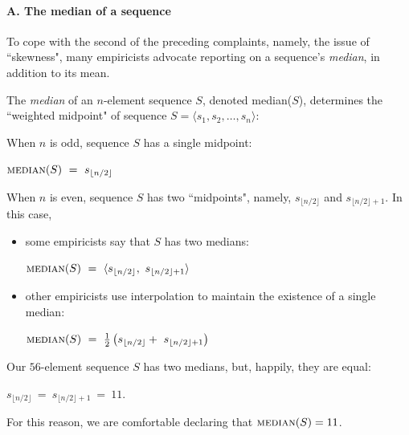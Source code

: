 \paragraph{A. The median of a sequence} 
To cope with the second of the preceding complaints, namely, the issue of ``skewness", many empiricists advocate reporting on a sequence's {\it median}, in addition to its mean.

\noindent
The {\em median} of an $n$-element sequence $S$, denoted {\sc median}($S$), determines 
the ``weighted midpoint" of  sequence $S = \langle s_1, s_2, \ldots, s_n \rangle$:

\medskip

\noindent When $n$ is odd, sequence $S$ has a single midpoint:

\hspace*{.35in}
$\mbox{\sc median}(S)  \ = \ s_{\lfloor n/2 \rfloor}$

\bigskip

\noindent When $n$ is even, sequence $S$ has two ``midpoints", namely, $s_{\lfloor n/2 \rfloor}$
and $s_{\lfloor n/2 \rfloor +1}$.  In this case,
\begin{itemize}
\item
some empiricists say that $S$ has two medians:

\hspace*{.35in}
$\mbox{\sc median}(S)  \ = \ \langle s_{\lfloor n/2 \rfloor}, \ s_{\lfloor n/2 \rfloor +1} \rangle$

\item
other empiricists use interpolation to maintain the existence of a single median:

\hspace*{.35in}
$\mbox{\sc median}(S)  \ = \ {1 \over 2} \left(s_{\lfloor n/2 \rfloor} + \ s_{\lfloor n/2 \rfloor +1} \right)$
\end{itemize}
Our $56$-element sequence $S$ has two medians, but, happily, they are equal:

\hspace*{.35in}
$s_{\lfloor n/2 \rfloor} \ = \ s_{\lfloor n/2 \rfloor +1} \ = \ 11$.  

\noindent
For this reason, we are comfortable declaring that $\mbox{\sc median}(S) = 11$.

\bigskip

\noindent {}
\bigskip

